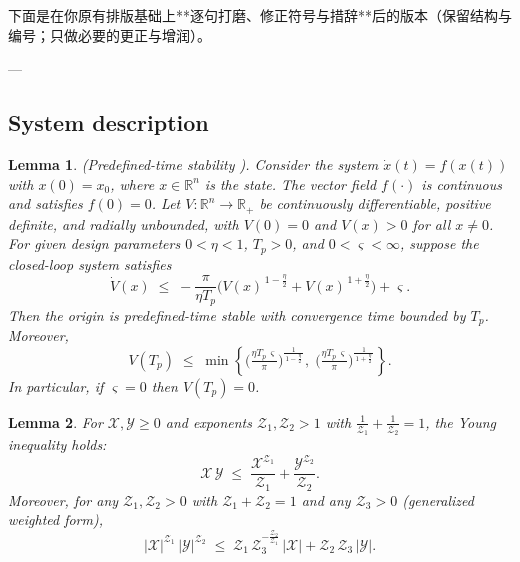 \documentclass[pdflatex,sn-mathphys-num]{sn-jnl}%
\theoremstyle{thmstyleone}%
\newtheorem{lemma}{Lemma}[section]
\theoremstyle{thmstyletwo}%
\theoremstyle{thmstylethree}%
\begin{document}

下面是在你原有排版基础上**逐句打磨、修正符号与措辞**后的版本（保留结构与编号；只做必要的更正与增润）。

---

\subsection{System description}






\begin{lemma} \label{lemma:1} (Predefined-time stability \cite{WangEtAl_2022_Adaptivefuzzy}).
	Consider the system $\dot{x}(t)=f(x(t))$ with $x(0)=x_0$, where $x\in\mathbb{R}^n$ is the state. The vector field $f(\cdot)$ is continuous and satisfies $f(0)=0$.
	Let $V:\mathbb{R}^n\to\mathbb{R}_+$ be continuously differentiable, positive definite, and radially unbounded, with $V(0)=0$ and $V(x)>0$ for all $x\neq 0$.
	For given design parameters $0<\eta<1$, $T_p>0$, and $0<\varsigma<\infty$, suppose the closed-loop system satisfies
	\begin{equation}\label{eq:7}
	  \dot V(x)\;\le\;
	  -\frac{\pi}{\eta T_p}\Big(V(x)^{\,1-\frac{\eta}{2}}+V(x)^{\,1+\frac{\eta}{2}}\Big)
	  +\varsigma .
	\end{equation}
	Then the origin is predefined-time stable with convergence time bounded by $T_p$. Moreover,
	\begin{equation}\label{eq:8}
	  V(T_p)\;\le\;
	  \min\!\left\{
		\Big(\tfrac{\eta T_p\,\varsigma}{\pi}\Big)^{\!\frac{1}{\,1-\frac{\eta}{2}\,}},
		\;
		\Big(\tfrac{\eta T_p\,\varsigma}{\pi}\Big)^{\!\frac{1}{\,1+\frac{\eta}{2}\,}}
	  \right\}.
	\end{equation}
	In particular, if $\varsigma=0$ then $V(T_p)=0$.
	\end{lemma}
	
	\begin{lemma}\label{lemma:2} \cite{TeeEtAl_2009_Barrierlyapunova}
	For $\mathcal{X},\mathcal{Y}\ge 0$ and exponents $\mathcal{Z}_1,\mathcal{Z}_2>1$ with $\tfrac{1}{\mathcal{Z}_1}+\tfrac{1}{\mathcal{Z}_2}=1$, the Young inequality holds:
	\begin{equation}\label{eq:9}
	  \mathcal{X}\,\mathcal{Y}\;\le\;\frac{\mathcal{X}^{\mathcal{Z}_1}}{\mathcal{Z}_1}
	  +\frac{\mathcal{Y}^{\mathcal{Z}_2}}{\mathcal{Z}_2}.
	\end{equation}
	Moreover, for any $\mathcal{Z}_{1},\mathcal{Z}_{2}>0$ with $\mathcal{Z}_{1}+\mathcal{Z}_{2}=1$ and any $\mathcal{Z}_{3}>0$ (generalized weighted form),
	\begin{equation}\label{eq:10}
	  |\mathcal{X}|^{\mathcal{Z}_{1}}\,|\mathcal{Y}|^{\mathcal{Z}_{2}}
	  \;\le\;
	  \mathcal{Z}_{1}\,\mathcal{Z}_{3}^{-\frac{\mathcal{Z}_{2}}{\mathcal{Z}_{1}}}\,|\mathcal{X}|
	  +\mathcal{Z}_{2}\,\mathcal{Z}_{3}\,|\mathcal{Y}|.
	\end{equation}
	\end{lemma}
	
\end{document}
